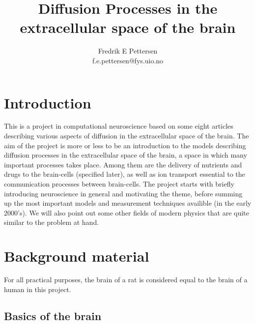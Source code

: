 \documentclass[a4paper,english, 12pt, twoside]{article}
\title{Diffusion Processes in the extracellular space of the brain}
\author{Fredrik E Pettersen\\ f.e.pettersen@fys.uio.no}
\begin{document}
\maketitle

% 
\tableofcontents
\newpage
\section{Introduction}
This is a project in computational neuroscience based on some eight articles describing various aspects of diffusion in the extracellular space of the brain. 
The aim of the project is more or less to be an introduction to the models describing diffusion processes in the extracellular space of the brain, a space in which many important processes takes place. 
Among them are the delivery of nutrients and drugs to the brain-cells (specified later), as well as ion transport essential to the communication processes between brain-cells. 
The project starts with briefly introducing neuroscience in general and motivating the theme, before summing up the most important models and measurement techniques availible (in the early 2000's). 
We will also point out some other fields of modern physics that are quite similar to the problem at hand.

\section{Background material}
For all practical purposes, the brain of a rat is considered equal to the brain of a human in this project.
\subsection{Basics of the brain}
\end{document}
